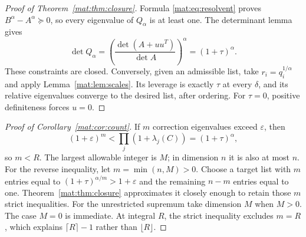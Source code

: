 \begin{proof}[Proof of Theorem~\ref{mat:thm:closure}]
Formula \eqref{mat:eq:resolvent} proves $B^\alpha-A^\alpha\succeq0$,
so every eigenvalue of $Q_\alpha$ is at least one. The determinant
lemma gives
\[
 \det Q_\alpha
    =\left(\frac{\det(A+uu^T)}{\det A}\right)^\alpha
    =(1+\tau)^\alpha.
\]
These constraints are closed. Conversely, given an admissible list,
take $r_i=q_i^{1/\alpha}$ and apply Lemma~\ref{mat:lem:scales}.
Its leverage is exactly $\tau$ at every $\delta$, and its relative
eigenvalues converge to the desired list, after ordering.
For $\tau=0$, positive definiteness forces $u=0$.
\end{proof}

\begin{proof}[Proof of Corollary~\ref{mat:cor:count}]
If $m$ correction eigenvalues exceed $\varepsilon$, then
\[
 (1+\varepsilon)^m<\prod_j(1+\lambda_j(C))
                 =(1+\tau)^\alpha,
\]
so $m<R$. The largest allowable integer is $M$; in dimension $n$ it
is also at most $n$.
For the reverse inequality, let $m=\min(n,M)>0$. Choose a target
list with $m$ entries equal to $(1+\tau)^{\alpha/m}>1+\varepsilon$
and the remaining $n-m$ entries equal to one. Theorem~\ref{mat:thm:closure}
approximates it closely enough to retain those $m$ strict inequalities.
For the unrestricted supremum take dimension $M$ when $M>0$.
The case $M=0$ is immediate. At integral $R$, the strict inequality
excludes $m=R$, which explains $\lceil R\rceil-1$ rather than
$\lfloor R\rfloor$.
\end{proof}

